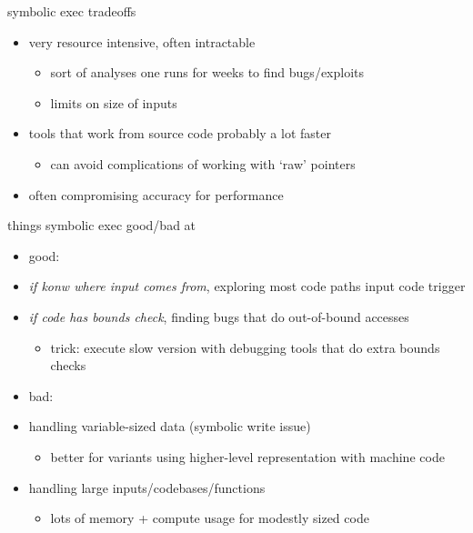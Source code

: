 \begin{frame}{symbolic exec tradeoffs}
    \begin{itemize}
    \item very resource intensive, often intractable
        \begin{itemize}
        \item sort of analyses one runs for weeks to find bugs/exploits
        \item limits on size of inputs
        \end{itemize}
    \item tools that work from source code probably a lot faster
        \begin{itemize}
        \item can avoid complications of working with `raw' pointers
        \end{itemize}
    \item often compromising accuracy for performance
    \end{itemize}
\end{frame}

\begin{frame}{things symbolic exec good/bad at}
    \begin{itemize}
    \item good:
    \item \textit{if konw where input comes from}, exploring most code paths input code trigger
    \item \textit{if code has bounds check}, finding bugs that do out-of-bound accesses
        \begin{itemize}
        \item trick: execute slow version with debugging tools that do extra bounds checks
        \end{itemize}
    \vspace{.5cm}
    \item bad:
    \item handling variable-sized data (symbolic write issue)
        \begin{itemize}
        \item better for variants using higher-level representation with machine code
        \end{itemize}
    \item handling large inputs/codebases/functions
        \begin{itemize}
        \item lots of memory + compute usage for modestly sized code
        \end{itemize}
    \end{itemize}
\end{frame}

